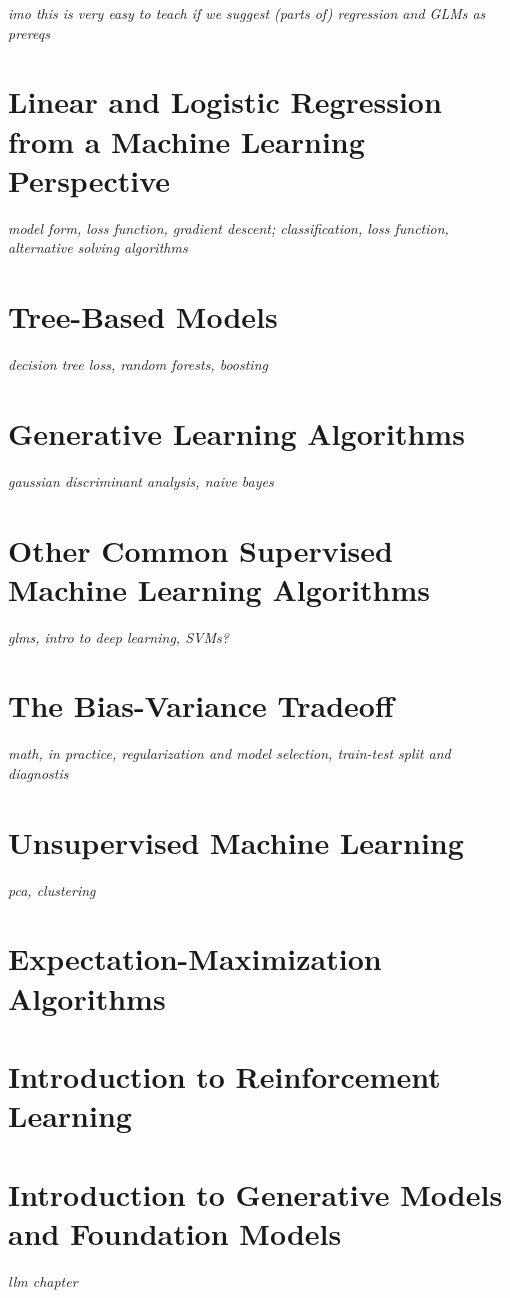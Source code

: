 \documentclass[../../../main.tex]{subfiles}
\begin{document}

\textit{imo this is very easy to teach if we suggest (parts of) regression and GLMs as prereqs}

\section{Linear and Logistic Regression from a Machine Learning Perspective}
\textit{model form, loss function, gradient descent; classification, loss function, alternative solving algorithms}
\section{Tree-Based Models}
\textit{decision tree loss, random forests, boosting}
\section{Generative Learning Algorithms}
\textit{gaussian discriminant analysis, naive bayes}
\section{Other Common Supervised Machine Learning Algorithms}
\textit{glms, intro to deep learning, SVMs?}
\section{The Bias-Variance Tradeoff}
\textit{math, in practice, regularization and model selection, train-test split and diagnostis}
\section{Unsupervised Machine Learning}
\textit{pca, clustering}
\section{Expectation-Maximization Algorithms}
\section{Introduction to Reinforcement Learning}
\section{Introduction to Generative Models and Foundation Models}
\textit{llm chapter}


\printbibliography[
    heading=subbibintoc,
    title={References}
]
\end{document}

